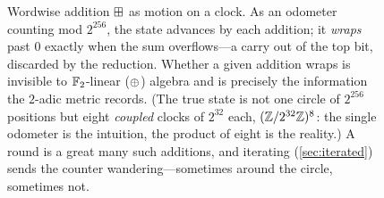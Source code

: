 \begin{figure}[ht]
  \centering
  \caption{Wordwise addition $\boxplus$ as motion on a clock. As an
  odometer counting mod $2^{256}$, the state advances by each addition;
  it \emph{wraps} past $0$ exactly when the sum overflows---a carry out of
  the top bit, discarded by the reduction. Whether a given addition wraps
  is invisible to $\mathbb{F}_2$-linear ($\oplus$) algebra and is precisely the
  information the $2$-adic metric records. (The true state is not one
  circle of $2^{256}$ positions but eight \emph{coupled} clocks of
  $2^{32}$ each, $(\mathbb{Z}/2^{32}\mathbb{Z})^8$: the single odometer is the intuition, the
  product of eight is the reality.) A round is a great many such
  additions, and iterating \SHA{} (\cref{sec:iterated}) sends the counter
  wandering---sometimes around the circle, sometimes not.}
  \label{fig:odometer}
\end{figure}

